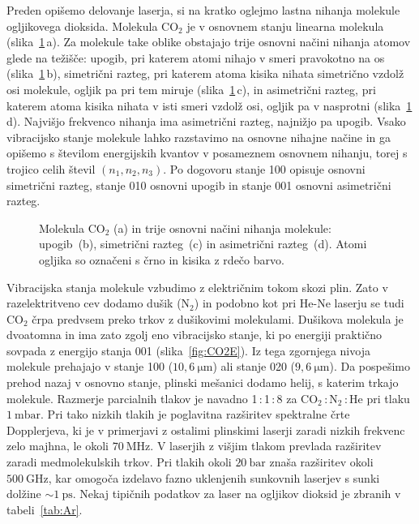 Preden opišemo delovanje laserja, si na kratko oglejmo lastna nihanja molekule 
ogljikovega dioksida. Molekula CO$_2$ je v osnovnem stanju linearna molekula 
(slika~\ref{fig:CO2}\,a). 
Za molekule take oblike obstajajo trije osnovni načini nihanja atomov glede na težišče:
upogib, pri katerem atomi nihajo v smeri pravokotno na os (slika~\ref{fig:CO2}\,b),
simetrični razteg, pri katerem atoma kisika nihata simetrično vzdolž osi molekule, ogljik pa pri tem miruje (slika~\ref{fig:CO2}\,c), in asimetrični razteg, pri 
katerem atoma kisika nihata v isti smeri vzdolž osi, ogljik pa v nasprotni 
(slika~\ref{fig:CO2}\,d). Najvišjo frekvenco nihanja ima asimetrični razteg,
najnižjo pa upogib.
Vsako vibracijsko stanje molekule lahko razstavimo na osnovne nihajne načine in 
ga opišemo s številom energijskih kvantov v posameznem osnovnem nihanju, 
torej s trojico celih števil $(n_1,n_2,n_3)$. Po dogovoru stanje 100 opisuje
osnovni simetrični razteg, stanje 010 osnovni upogib in stanje 001 
osnovni asimetrični razteg.

\begin{figure}[ht]
\centering
\def\svgwidth{100truemm} 

\caption{Molekula CO$_2$ (a) in trije osnovni načini nihanja molekule:
upogib~(b), simetrični razteg~(c) in asimetrični razteg~(d). Atomi ogljika so označeni s črno
in kisika z rdečo barvo.}
\label{fig:CO2}
\end{figure}

Vibracijska stanja molekule vzbudimo z električnim tokom skozi plin. 
Zato v razelektritveno cev dodamo dušik (N$_2$) in podobno kot pri He-Ne laserju
se tudi CO$_2$ črpa predvsem preko trkov z dušikovimi molekulami. 
Dušikova molekula je dvoatomna in ima zato zgolj eno vibracijsko stanje, ki po energiji
praktično sovpada z energijo stanja 001 (slika~\ref{fig:CO2E}). Iz tega zgornjega
nivoja molekule prehajajo v stanje 100 ($10,6~\si{\micro\metre}$) ali stanje
020 ($9,6~\si{\micro\metre}$). Da pospešimo prehod nazaj v osnovno stanje, 
plinski mešanici dodamo helij, s katerim trkajo molekule.
Razmerje parcialnih tlakov je navadno 1\,:\,1\,:\,8 za CO$_2$\,:\,N$_2$\,:\,He pri tlaku $1~\si{\milli\bar}$. 
Pri tako nizkih tlakih je poglavitna razširitev spektralne črte Dopplerjeva, 
ki 
je v primerjavi z ostalimi plinskimi laserji zaradi nizkih frekvenc zelo majhna,
le okoli $70~\si{\mega\hertz}$. V laserjih z višjim tlakom 
prevlada razširitev zaradi medmolekulskih trkov. Pri tlakih okoli $20~\si{\bar}$
znaša razširitev okoli $500~\si{\giga\hertz}$, kar omogoča izdelavo fazno uklenjenih 
sunkovnih laserjev s sunki dolžine $\sim 1~\si{\pico\second}$. Nekaj tipičnih podatkov 
za laser na ogljikov dioksid je zbranih v tabeli~\ref{tab:Ar}.

